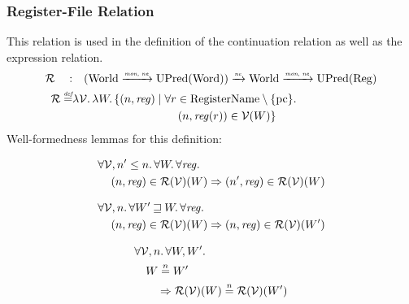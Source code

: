 \documentclass{article}
\newcommand{\monnefun}{\xrightarrow{\textit{\tiny{mon, ne}}}}
\newcommand{\nefun}{\xrightarrow{\textit{\tiny{ne}}}}
\newcommand{\defeq}{\stackrel{\textit{\tiny{def}}}{=}}
\newcommand{\nequal}[1][n]{\stackrel{\tiny{#1}}{=}}
\newcommand{\var}[1]{\mathit{#1}}
\newcommand{\pcreg}{\mathrm{pc}}
\newcommand{\reg}{\var{reg}}
\newcommand{\future}{\mathbin{\sqsupseteq}}
\newcommand{\asmType}{\plaindom{AsmType}}
\newcommand{\plaindom}[1]{\mathrm{#1}}
\newcommand{\Words}{\plaindom{Word}}
\newcommand{\RegName}{\plaindom{RegisterName}}
\newcommand{\Regs}{\plaindom{Reg}}
\newcommand{\Worlds}{\plaindom{World}}
\newcommand{\UPred}[1]{\plaindom{UPred}(#1)}
\newcommand{\intr}[2]{\mathcal{#1}}
\newcommand{\valueintr}[1]{\intr{V}{#1}}
\newcommand{\regintr}[1]{\intr{R}{#1}}
\newcommand{\stdvr}{\valueintr{\asmType}}
\newcommand{\stdrr}{\regintr{\asmType}}
\newcommand{\npair}[2][n]{\left(#1,#2 \right)}
\begin{document}
\subsubsection{Register-File Relation}
\label{subsubsec:register-file-relation}
This relation is used in the definition of the continuation relation as well as the expression relation.
\begin{align*}
  \stdrr \quad : & \quad (\Worlds \monnefun \UPred{\Words}) \nefun \Worlds \monnefun \UPred{\Regs} \\
  \stdrr \defeq & \lambda \stdvr \ldotp \lambda W \ldotp
                     \begin{aligned}[t]
                       \{ \npair{\reg} \mid & \;\forall r \in \RegName \setminus \{\pcreg\} \ldotp \\
                                            & \;\quad  \npair{\reg(r)} \in \stdvr(W) \}
                     \end{aligned}
\end{align*}
Well-formedness lemmas for this definition:
\begin{lemma}
\label{lem:reg-dc}
  \begin{align*}
    &\forall \stdvr, n' \leq n \ldotp \forall W \ldotp \forall \reg \ldotp\\
    &\quad \npair{\reg} \in \stdrr(\stdvr)(W) \Rightarrow \npair[n']{\reg} \in \stdrr(\stdvr)(W)
  \end{align*}
\end{lemma}

\begin{lemma}
\label{lem:reg-mono-worlds}
  \begin{align*}
    &\forall \stdvr, n \ldotp \forall W' \future W \ldotp \forall \reg \ldotp\\
    &\quad \npair{\reg} \in \stdrr(\stdvr)(W) \Rightarrow \npair{\reg} \in \stdrr(\stdvr)(W')
  \end{align*}
\end{lemma}

\begin{lemma}
  \label{lem:reg-ne-worlds}
  \begin{align*}
    &\forall \stdvr, n \ldotp \forall W, W' \ldotp \\
    &\quad W \nequal W' \\
    &\qquad \Rightarrow \stdrr(\stdvr)(W) \nequal \stdrr(\stdvr)(W')
  \end{align*}
\end{lemma}
\end{document}
